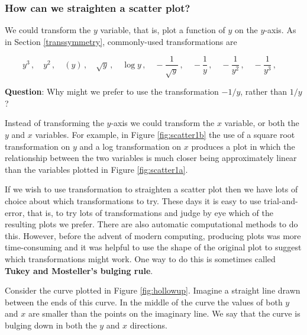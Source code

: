 \documentclass[
  11pt,
  british,
  openany, a4paper]{book}
\begin{document}
\hypertarget{how-can-we-straighten-a-scatter-plot}{%
\subsubsection*{How can we straighten a scatter plot?}\label{how-can-we-straighten-a-scatter-plot}}

We could transform the \(y\) variable, that is, plot a function of \(y\) on the \(y\)-axis. As in Section \ref{transsymmetry}, commonly-used transformations are

\[
y^3\,, \quad
y^2\,, \quad
(y)\,, \quad 
\sqrt{y}\,, \quad
\log y\,, \quad
-\frac{1}{\sqrt{y}}\,, \quad
-\frac1y\,, \quad
-\frac{1}{y^2}\,, \quad
-\frac{1}{y^3}\,, \quad 
\]

\textbf{Question}: Why might we prefer to use the transformation \(-1/y\), rather than \(1/y\)?

Instead of transforming the \(y\)-axis we could transform the \(x\) variable, or both the \(y\) and \(x\) variables. For example, in Figure \ref{fig:scatter1b} the use of a square root transformation on \(y\) and a log transformation on \(x\) produces a plot in which the relationship between the two variables is much closer being approximately linear than the variables plotted in Figure \ref{fig:scatter1a}.

If we wish to use transformation to straighten a scatter plot then we have lots of choice about which transformations to try. These days it is easy to use trial-and-error, that is, to try lots of transformations and judge by eye which of the resulting plots we prefer. There are also automatic computational methods to do this. However, before the advent of modern computing, producing plots was more time-consuming and it was helpful to use the shape of the original plot to suggest which transformations might work. One way to do this is sometimes called \textbf{Tukey and Mosteller's bulging rule}.

Consider the curve plotted in Figure \ref{fig:hollowup}. Imagine a straight line drawn between the ends of this curve. In the middle of the curve the values of both \(y\) and \(x\) are smaller than the points on the imaginary line. We say that the curve is bulging down in both the \(y\) and \(x\) directions.
\end{document}

